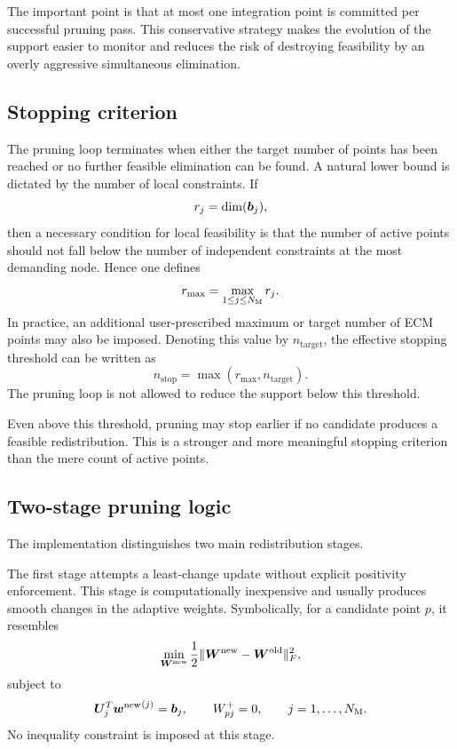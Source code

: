 \documentclass[11pt,a4paper]{article}
\begin{document}
The important point is that at most one integration point is committed per
successful pruning pass. This conservative strategy makes the evolution of the
support easier to monitor and reduces the risk of destroying feasibility by an
overly aggressive simultaneous elimination.

\subsection{Stopping criterion}

The pruning loop terminates when either the target number of points has been
reached or no further feasible elimination can be found. A natural lower bound
is dictated by the number of local constraints. If
\[
        r_j = \dim(\bm b_j),
\]
then a necessary condition for local feasibility is that the number of active
points should not fall below the number of independent constraints at the most
demanding node. Hence one defines
\[
        r_{\max}
        =
        \max_{1\leq j\leq N_{\mathrm{M}}} r_j.
\]
In practice, an additional user-prescribed maximum or target number of ECM
points may also be imposed. Denoting this value by $n_{\mathrm{target}}$, the
effective stopping threshold can be written as
\[
        n_{\mathrm{stop}}
        =
        \max(r_{\max},n_{\mathrm{target}}).
\]
The pruning loop is not allowed to reduce the support below this threshold.

Even above this threshold, pruning may stop earlier if no candidate produces a
feasible redistribution. This is a stronger and more meaningful stopping
criterion than the mere count of active points.

\subsection{Two-stage pruning logic}

The implementation distinguishes two main redistribution stages.

The first stage attempts a least-change update without explicit positivity
enforcement. This stage is computationally inexpensive and usually produces
smooth changes in the adaptive weights. Symbolically, for a candidate point
$p$, it resembles
\[
        \min_{\bm W^{\mathrm{new}}}
        \frac{1}{2}\|\bm W^{\mathrm{new}}-\bm W^{\mathrm{old}}\|_F^2,
\]
subject to
\[
        \bm U_j^T{\bm w^{\mathrm{new}}}^{(j)}=\bm b_j,
        \qquad
        W_{pj}^{+}=0,
        \qquad
        j=1,\ldots,N_{\mathrm{M}}.
\]
No inequality constraint is imposed at this stage.
\end{document}

